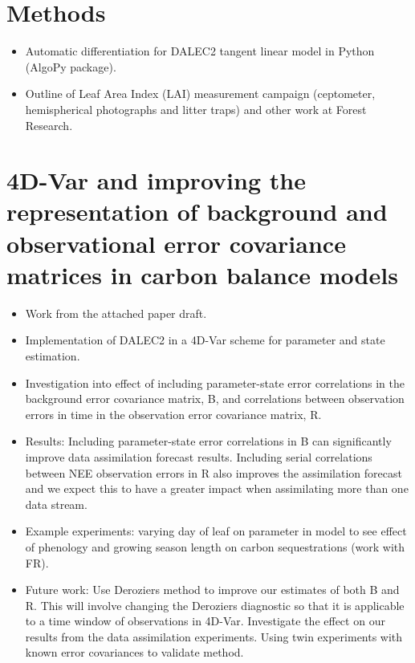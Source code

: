 \documentclass[11pt]{article}
\begin{document}
\section{Methods}
\begin{itemize}
\item Automatic differentiation for DALEC2 tangent linear model in Python (AlgoPy package).
\item Outline of Leaf Area Index (LAI) measurement campaign (ceptometer, hemispherical photographs and litter traps) and other work at Forest Research.
\end{itemize}


\section{4D-Var and improving the representation of background and observational error covariance matrices in carbon balance models}
\begin{itemize}
\item Work from the attached paper draft.
\item Implementation of DALEC2 in a 4D-Var scheme for parameter and state estimation.
\item Investigation into effect of including parameter-state error correlations in the background error covariance matrix, B, and correlations between observation errors in time in the observation error covariance matrix, R.
\item Results: Including parameter-state error correlations in B can significantly improve data assimilation forecast results. Including serial correlations between NEE observation errors in R also improves the assimilation forecast and we expect this to have a greater impact when assimilating more than one data stream.
\item Example experiments: varying day of leaf on parameter in model to see effect of phenology and growing season length on carbon sequestrations (work with FR).
\item Future work: Use Deroziers method to improve our estimates of both B and R. This will involve changing the Deroziers diagnostic so that it is applicable to a time window of observations in 4D-Var. Investigate the effect on our results from the data assimilation experiments. Using twin experiments with known error covariances to validate method.
\end{itemize}
\end{document}
